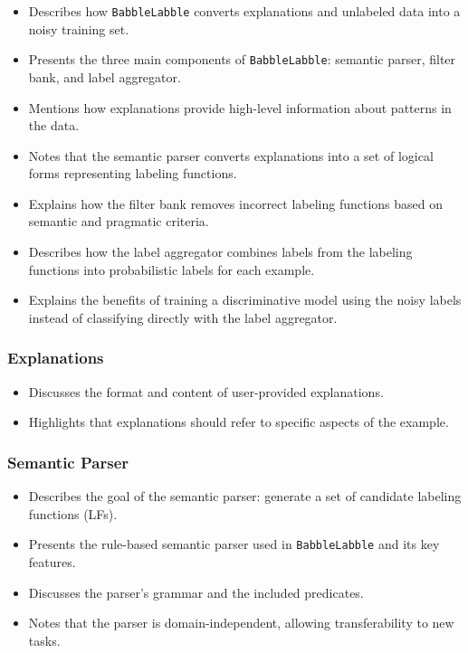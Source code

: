 \documentclass[
  letterpaper,
  DIV=11,
  numbers=noendperiod,
  oneside]{scrartcl}
\providecommand{\tightlist}{%
  \setlength{\itemsep}{0pt}\setlength{\parskip}{0pt}}
\begin{document}
\begin{itemize}
\tightlist
\item
  Describes how \texttt{BabbleLabble} converts explanations and
  unlabeled data into a noisy training set.
\item
  Presents the three main components of \texttt{BabbleLabble}: semantic
  parser, filter bank, and label aggregator.
\item
  Mentions how explanations provide high-level information about
  patterns in the data.
\item
  Notes that the semantic parser converts explanations into a set of
  logical forms representing labeling functions.
\item
  Explains how the filter bank removes incorrect labeling functions
  based on semantic and pragmatic criteria.
\item
  Describes how the label aggregator combines labels from the labeling
  functions into probabilistic labels for each example.
\item
  Explains the benefits of training a discriminative model using the
  noisy labels instead of classifying directly with the label
  aggregator.
\end{itemize}

\subsubsection{Explanations}\label{explanations}

\begin{itemize}
\tightlist
\item
  Discusses the format and content of user-provided explanations.
\item
  Highlights that explanations should refer to specific aspects of the
  example.
\end{itemize}

\subsubsection{Semantic Parser}\label{semantic-parser}

\begin{itemize}
\tightlist
\item
  Describes the goal of the semantic parser: generate a set of candidate
  labeling functions (LFs).
\item
  Presents the rule-based semantic parser used in \texttt{BabbleLabble}
  and its key features.
\item
  Discusses the parser's grammar and the included predicates.
\item
  Notes that the parser is domain-independent, allowing transferability
  to new tasks.
\end{itemize}
\end{document}
